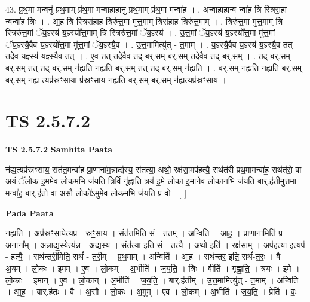 \documentclass[17pt]{extarticle}
\begin{document}
43. प्र॒थ॒मा मन्वनु॑ प्रथ॒माम् प्र॑थ॒मा मन्वा॑हा॒हानु॑ प्रथ॒माम् प्र॑थ॒मा मन्वा॑ह । . अन्वा॑हा॒हान्व न्वा॑ह॒ त्रि स्त्रिरा॒हा न्वन्वा॑ह॒ त्रिः । . आ॒ह॒ त्रि स्त्रिरा॑हाह॒ त्रिरु॑त्त॒मा मु॑त्त॒माम् त्रिरा॑हाह॒ त्रिरु॑त्त॒माम् । . त्रिरु॑त्त॒मा मु॑त्त॒माम् त्रि स्त्रिरु॑त्त॒मां ॅय॒ज्ञ्स्य॑ य॒ज्ञ्स्यो᳚त्त॒माम् त्रि स्त्रिरु॑त्त॒मां ॅय॒ज्ञ्स्य॑ । . उ॒त्त॒मां ॅय॒ज्ञ्स्य॑ य॒ज्ञ्स्यो᳚त्त॒मा मु॑त्त॒मां ॅय॒ज्ञ्स्यै॒वैव य॒ज्ञ्स्यो᳚त्त॒मा मु॑त्त॒मां ॅय॒ज्ञ्स्यै॒व । . उ॒त्त॒मामित्यु॑त् - त॒माम् । . य॒ज्ञ्स्यै॒वैव य॒ज्ञ्स्य॑ य॒ज्ञ्स्यै॒व तत् तदे॒व य॒ज्ञ्स्य॑ य॒ज्ञ्स्यै॒व तत् । . ए॒व तत् तदे॒वैव तद् ब॒र्॒.सम् ब॒र्॒.सम् तदे॒वैव तद् ब॒र्॒.सम् । . तद् ब॒र्॒.सम् ब॒र्॒.सम् तत् तद् ब॒र्॒.सम् न॑ह्यति नह्यति ब॒र्॒.सम् तत् तद् ब॒र्॒.सम् न॑ह्यति । . ब॒र्॒.सम् न॑ह्यति नह्यति ब॒र्॒.सम् ब॒र्॒.सम् न॑ह्य॒ त्यप्र॑स्रꣳसा॒या प्र॑स्रꣳसाय नह्यति ब॒र्॒.सम् ब॒र्॒.सम् न॑ह्य॒त्यप्र॑स्रꣳसाय । \newline
\pagebreak
{}
\section*{ TS 2.5.7.2 }

\textbf{TS 2.5.7.2 } \newline
\textbf{Samhita Paata} \newline

न॑ह्य॒त्यप्र॑स्रꣳसाय॒ संत॑त॒मन्वा॑ह प्रा॒णाना॑म॒न्नाद्य॑स्य॒ संत॑त्या॒ अथो॒ रक्ष॑सा॒मप॑हत्यै॒ राथ॑तंरीं प्रथ॒मामन्वा॑ह॒ राथ॑तंरो॒ वा अ॒यं ॅलो॒क इ॒ममे॒व लो॒कम॒भि ज॑यति॒ त्रिर्वि गृ॑ह्णाति॒ त्रय॑ इ॒मे लो॒का इ॒माने॒व लो॒कान॒भि ज॑यति॒ बार्.ह॑तीमुत्त॒मा-मन्वा॑ह॒ बार्.ह॑तो॒ वा अ॒सौ लो॒को॑ऽमुमे॒व लो॒कम॒भि ज॑यति॒ प्र वो॒ - [  ] \newline

\textbf{Pada Paata} \newline

न॒ह्य॒ति॒ । अप्र॑स्रꣳसा॒येत्यप्र॑ - स्रꣳ॒॒सा॒य॒ । संत॑त॒मिति॒ सं - त॒त॒म् । अन्विति॑ । आ॒ह॒ । प्रा॒णाना॒मिति॑ प्र - अ॒नाना᳚म् । अ॒न्नाद्य॒स्येत्य॑न्न - अद्य॑स्य । संत॑त्या॒ इति॒ सं - त॒त्यै॒ । अथो॒ इति॑ । रक्ष॑साम् । अप॑हत्या॒ इत्यप॑ - ह॒त्यै॒ । राथ॑न्तरी॒मिति॒ राथं᳚ - त॒री॒म् । प्र॒थ॒माम् । अन्विति॑ । आ॒ह॒ । राथ॑न्तर॒ इति॒ राथं᳚-त॒रः॒ । वै । अ॒यम् । लो॒कः । इ॒मम् । ए॒व । लो॒कम् । अ॒भीति॑ । ज॒य॒ति॒ । त्रिः । वीति॑ । गृ॒ह्णा॒ति॒ । त्रयः॑ । इ॒मे । लो॒काः । इ॒मान् । ए॒व । लो॒कान् । अ॒भीति॑ । ज॒य॒ति॒ । बार्.ह॑तीम् । उ॒त्त॒मामित्यु॑त् - त॒माम् । अन्विति॑ । आ॒ह॒ । बार्.ह॑तः । वै । अ॒सौ । लो॒कः । अ॒मुम् । ए॒व । लो॒कम् । अ॒भीति॑ । ज॒य॒ति॒ । प्रेति॑ । वः॒ ।  \newline
\end{document}
